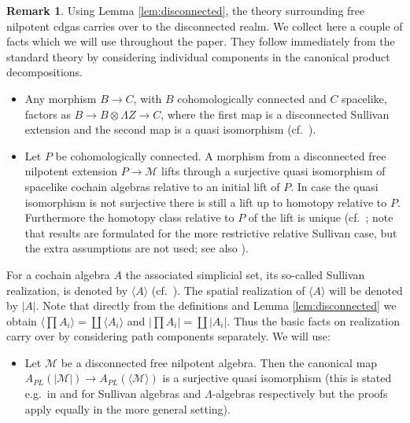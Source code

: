 \documentclass[12pt,a4paper]{article}
\theoremstyle{definition}
\newtheorem{rem}[thm]{Remark}
\begin{document}
\begin{rem}\label{rem:technicalstuff}
Using Lemma \ref{lem:disconnected}, the theory surrounding free nilpotent cdgas carries over to the disconnected realm. We collect here a couple of facts which we will use throughout the paper. They follow immediately from the standard theory by considering individual components in the canonical product decompositions.

\begin{itemize}
\item Any morphism $B\rightarrow C$, with $B$ cohomologically connected and $C$ spacelike, factors as $B\rightarrow B\otimes \Lambda Z\rightarrow C$, where the first map is a disconnected Sullivan extension and the second map is a quasi isomorphism (cf.\ \cite[Theorem 3.1]{BibelII}).

\item Let $P$ be cohomologically connected. A morphism from a disconnected free nilpotent extension $P\rightarrow \mathcal{M}$ lifts through a surjective quasi isomorphism of spacelike cochain algebras relative to an initial lift of $P$. In case the quasi isomorphism is not surjective there is still a lift up to homotopy relative to $P$. Furthermore the homotopy class relative to $P$ of the lift is unique (cf.\ \cite[Lemma 14.4, Proposition 14.6]{BibelI}; note that results are formulated for the more restrictive relative Sullivan case, but the extra assumptions are not used; see also \cite[Lemma 1.2]{BibelII}).
\end{itemize}

For a cochain algebra $A$ the associated simplicial set, its so-called Sullivan realization, is denoted by $\langle A \rangle$ (cf.\ \cite[p.\ 247]{BibelI}). The spatial realization of $\langle A\rangle$ will be denoted by $\vert A\vert$. Note that directly from the definitions and Lemma \ref{lem:disconnected} we obtain $\langle \prod A_i\rangle=\coprod \langle A_i\rangle$ and $\vert \prod A_i\vert=\coprod \vert A_i\vert$. Thus the basic facts on realization carry over by considering path components separately. We will use:
\begin{itemize}
\item Let $\mathcal{M}$ be a disconnected free nilpotent algebra. Then the canonical map $A_{PL}(\vert\mathcal{M}\vert)\rightarrow A_{PL}(\langle\mathcal{M}\rangle)$ is a surjective quasi isomorphism (this is stated e.g.\ in \cite[p.\ 249]{BibelI} and \cite[p.\ 28]{BibelII} for Sullivan algebras and $\Lambda$-algebras respectively but the proofs apply equally in the more general setting).


\end{itemize}
\end{rem}
\end{document}
